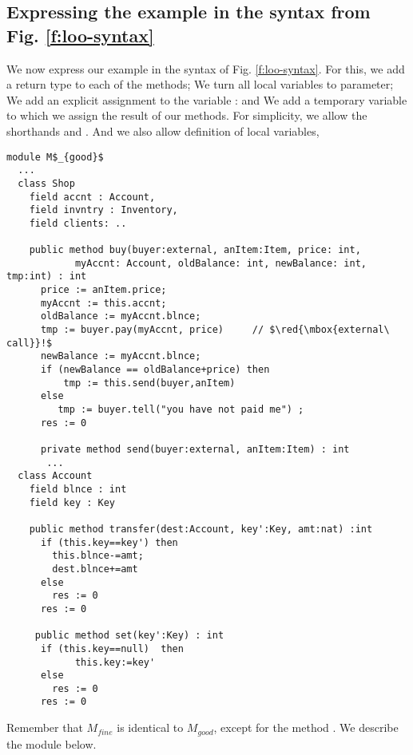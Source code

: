 \subsection{Expressing the  example in the syntax from Fig. \ref{f:loo-syntax}}
\label{s:app:syntax:transform}

{
We now express our example in the syntax of Fig. \ref{f:loo-syntax}. 
For this, we  add a return type to each of the methods; 
We turn all local variables to parameter; We add an explicit assignment to the variable : and We   add a temporary variable  to which we assign the result of our  methods.
For simplicity, we allow %
the shorthands \prg{+=} and \prg{-=}.
And we also allow definition of local variables, \eg  {} }

\begin{lstlisting}[mathescape=true, language=Chainmail, frame=lines]
module M$_{good}$
  ...   
  class Shop
    field accnt : Account, 
    field invntry : Inventory, 
    field clients: ..
  
    public method buy(buyer:external, anItem:Item, price: int, 
            myAccnt: Account, oldBalance: int, newBalance: int, tmp:int) : int
      price := anItem.price;
      myAccnt := this.accnt;
      oldBalance := myAccnt.blnce;
      tmp := buyer.pay(myAccnt, price)     // $\red{\mbox{external\ call}}!$
      newBalance := myAccnt.blnce;
      if (newBalance == oldBalance+price) then
          tmp := this.send(buyer,anItem)
      else
         tmp := buyer.tell("you have not paid me") ; 
      res := 0
     
      private method send(buyer:external, anItem:Item) : int
       ... 
  class Account
    field blnce : int 
    field key : Key
    
    public method transfer(dest:Account, key':Key, amt:nat) :int
      if (this.key==key') then
        this.blnce-=amt;
        dest.blnce+=amt
      else
        res := 0
      res := 0
	  
     public method set(key':Key) : int
      if (this.key==null)  then
      		this.key:=key'
      else 
        res := 0
      res := 0
\end{lstlisting}

\noindent
Remember that $M_{fine}$ is identical to $M_{good}$, except for the method . We describe the module below.


